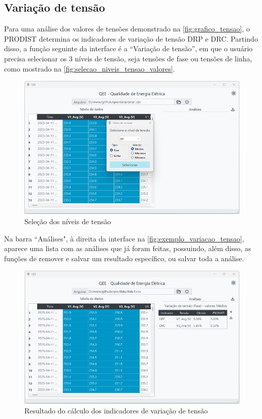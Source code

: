\subsection{Variação de tensão}

Para uma análise dos valores de tensões demonstrado na \autoref{fig:grafico_tensao}, o PRODIST determina os indicadores de variação de tensão DRP e DRC. Partindo disso, a função seguinte da interface é a “Variação de tensão”, em que o usuário precisa selecionar os 3 níveis de tensão, seja tensões de fase ou tensões de linha, como mostrado na \autoref{fig:selecao_niveis_tensao_valores}.

\begin{figure}[H]
  \centering
  \caption{Seleção dos níveis de tensão}
  \label{fig:selecao_niveis_tensao_valores}
  \includegraphics[width=15cm]{illustrations/figures/selecao_niveis_tensao_valores.png}
\end{figure}

Na barra ``Análises", à direita da interface na \autoref{fig:exemplo_variacao_tensao}, aparece uma lista com as análises que já foram feitas, possuindo, além disso, as funções de remover e salvar um resultado específico, ou salvar toda a análise.

\begin{figure}[H]
  \centering
  \caption{Resultado do cálculo dos indicadores de variação de tensão}
  \label{fig:exemplo_variacao_tensao}
  \includegraphics[width=15cm]{illustrations/figures/exemplo_variacao_tensao.png}
\end{figure}

